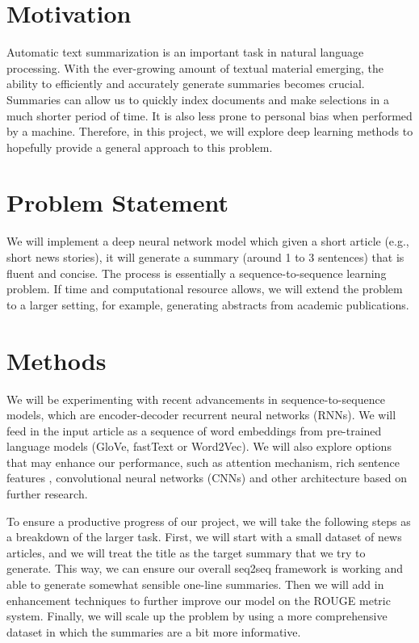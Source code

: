 \section{Motivation}
Automatic text summarization is an important task in natural language processing. With the ever-growing amount of textual material emerging, the ability to efficiently and accurately generate summaries becomes crucial. Summaries can allow us to quickly index documents and make selections in a much shorter period of time. It is also less prone to personal bias when performed by a machine. Therefore, in this project, we will explore deep learning methods to hopefully provide a general approach to this problem.

\section{Problem Statement}
We will implement a deep neural network model which given a short article (e.g., short news stories), it will generate a summary (around 1 to 3 sentences) that is fluent and concise. The process is essentially a sequence-to-sequence learning problem. If time and computational resource allows, we will extend the problem to a larger setting, for example, generating abstracts from academic publications. 



\section{Methods}
We will be experimenting with recent advancements in sequence-to-sequence models, which are encoder-decoder recurrent neural networks (RNNs). We will feed in the input article as a sequence of word embeddings from pre-trained language models (GloVe, fastText or Word2Vec). We will also explore options that may enhance our performance, such as attention mechanism, rich sentence features , convolutional neural networks (CNNs) and other architecture based on further research.  

To ensure a productive progress of our project, we will take the following steps as a breakdown of the larger task. First, we will start with a small dataset of news articles, and we will treat the title as the target summary that we try to generate. This way, we can ensure our overall seq2seq framework is working and able to generate somewhat sensible one-line summaries. Then we will add in enhancement techniques to further improve our model on the ROUGE metric system. Finally, we will scale up the problem by using a more comprehensive dataset in which the summaries are a bit more informative. 

